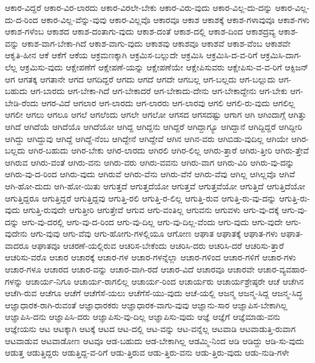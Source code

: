 {ಆಕಾರ-ವಿದ್ದರೆ
ಆಕಾರ-ವಿರ-ಲಾರದು
ಆಕಾರ-ವಿರಲೇ-ಬೇಕು
ಆಕಾರ-ವಿರು-ವುದು
ಆಕಾರ-ವಿಲ್ಲ-ದು-ದನ್ನು
ಆಕಾರ-ವಿಲ್ಲ-ದು-ದ-ರಿಂದ
ಆಕಾರ-ವಿಲ್ಲ-ವೆನ್ನು-ವುವು
ಆಕಾರ-ವಿಲ್ಲವೊ
ಆಕಾರವೂ
ಆಕಾಶ
ಆಕಾಶಕ್ಕೆ
ಆಕಾಶ-ಗಳಾವುವೂ
ಆಕಾಶ-ಗಳು
ಆಕಾಶ-ಗಳೆಂಬ
ಆಕಾಶದ
ಆಕಾಶ-ದಂತಾಗು-ವುದು
ಆಕಾಶ-ದಂತೆ
ಆಕಾಶ-ದಲ್ಲಿ
ಆಕಾಶ-ದಿಂದ
ಆಕಾಶದ್ರವ್ಯ
ಆಕಾಶ-ವನ್ನು
ಆಕಾಶ-ವಾಗ-ಬೇಕಾ-ಗಿದೆ
ಆಕಾಶ-ವಾಗು-ವುದು
ಆಕಾಶವು
ಆಕಾಶವೂ
ಆಕಾಶವೆ
ಆಕಾಶ-ವೆಂಬ
ಆಕಾಶವೇ
ಆಕೃತಿ-ಹೀನ
ಆಕೆ
ಆಕೆಗೆ
ಆಕೆಯ
ಆಕ್ರಮಣಕ್ಕಾಗಿ
ಆಕ್ರಮಿಸ-ಬಲ್ಲುದೇ
ಆಕ್ರಮಿಸಿ
ಆಕ್ರಮಿಸಿ-ದ-ವ-ರಿಗೆ
ಆಕ್ರಮಿಸಿ-ದಾಗ-ಲೆಲ್ಲ
ಆಕ್ರಮಿಸು-ವುದು
ಆಕ್ಷೇಪಣೆಗೆ
ಆಕ್ಷೇಪಣೆ-ಯನ್ನು
ಆಕ್ಷೇಪಣೆಯೇ
ಆಕ್ಷೇಪಿಸುವರು
ಆಕ್ಷೇಪಿಸು-ವ-ವ-ರಿಗೆ
ಆಕ್ಸಿಜನ್
ಆಗ
ಆಗತಕ್ಕ
ಆಗತಾನೇ
ಆಗದ
ಆಗದಿದ್ದರೆ
ಆಗದು
ಆಗದೆ
ಆಗದೇ
ಆಗಬಲ್ಲ
ಆಗ-ಬಲ್ಲದು
ಆಗ-ಬಲ್ಲುದು
ಆಗ-ಬಹುದು
ಆಗ-ಬಾರದು
ಆಗ-ಬೇಕಾ-ಗಿದೆ
ಆಗ-ಬೇಕಾದರೆ
ಆಗ-ಬೇಕಾದು-ದೇನು
ಆಗ-ಬೇಕಾದ್ದೇನು
ಆಗ-ಬೇಕು
ಆಗ-ಬೇಡಿ-ರೆಂದು
ಆಗರ-ವಿದೆ
ಆಗಲಾರ
ಆಗ-ಲಾರದು
ಆಗ-ಲಾರರು
ಆಗ-ಲಾರವು
ಆಗಲಿ
ಆಗಲಿ-ರು-ವುದು
ಆಗಲಿಲ್ಲ
ಆಗಲೀ
ಆಗಲು
ಆಗಲೂ
ಆಗಲೆ
ಆಗಲೆಂದು
ಆಗಲೇ
ಆಗಲೋ
ಆಗಸದ
ಆಗಸದಷ್ಟು
ಆಗಾಗ
ಆಗಿ
ಆಗಿಂದಾಗ್ಗೆ
ಆಗಿತ್ತು
ಆಗಿದೆ
ಆಗಿದೆಯೆ
ಆಗಿದೆಯೊ
ಆಗಿದೆಯೋ
ಆಗಿದ್ದ
ಆಗಿದ್ದನು
ಆಗಿದ್ದರೆ
ಆಗಿದ್ದಾಗ್ಯೂ
ಆಗಿದ್ದಾನೆ
ಆಗಿದ್ದಿದ್ದರೆ
ಆಗಿದ್ದೀರಿ
ಆಗಿದ್ದು
ಆಗಿದ್ದುವು
ಆಗಿದ್ದೆ
ಆಗಿದ್ದೆ-ನೆಂಬ
ಆಗಿದ್ದೇನೆ
ಆಗಿದ್ದೇವೆ
ಆಗಿನ
ಆಗಿನ-ವರು
ಆಗಿಬಿಡು-ವುದಿಲ್ಲ
ಆಗಿಯೇ
ಆಗಿರ-ಬಲ್ಲದು
ಆಗಿರ-ಬಹುದು
ಆಗಿರ-ಬೇಕು
ಆಗಿರ-ಲಾರದು
ಆಗಿರಲಿ
ಆಗಿರ-ಲಿಲ್ಲ
ಆಗಿರು-ತ್ತಾರೆ
ಆಗಿರು-ತ್ತೀರಿ
ಆಗಿರು-ತ್ತೇವೆ
ಆಗಿರುವ
ಆಗಿರು-ವಂತೆ
ಆಗಿರು-ವನು
ಆಗಿರು-ವರು
ಆಗಿರು-ವವನು
ಆಗಿರು-ವಾಗ
ಆಗಿರು-ವಿರಿ
ಆಗಿರು-ವು-ದನ್ನು
ಆಗಿರು-ವು-ದ-ರಿಂದ
ಆಗಿರು-ವುದು
ಆಗಿರುವೆ
ಆಗಿರು-ವೆನು
ಆಗಿರು-ವೆನೆ
ಆಗಿರು-ವೆವು
ಆಗಿಲ್ಲ
ಆಗಿಲ್ಲವೊ
ಆಗಿವೆ
ಆಗಿ-ಹೋ-ದುದು
ಆಗಿ-ಹೋ-ಯಿತು
ಆಗುತ್ತದೆ
ಆಗುತ್ತದೆಯೋ
ಆಗುತ್ತವೆ
ಆಗುತ್ತವೆಯೋ
ಆಗುತ್ತಿದೆ
ಆಗುತ್ತಿದೆಯೋ
ಆಗುತ್ತಿದ್ದರೂ
ಆಗುತ್ತಿದ್ದರೆ
ಆಗುತ್ತಿದ್ದವು
ಆಗುತ್ತಿ-ರಲಿ
ಆಗುತ್ತಿ-ರ-ಲಿಲ್ಲ
ಆಗುತ್ತಿ-ರುವ
ಆಗುತ್ತಿ-ರು-ವು-ದನ್ನು
ಆಗುತ್ತಿ-ರು-ವುದು
ಆಗುತ್ತಿ-ರುವುದೇ
ಆಗುತ್ತೀರಿ
ಆಗುತ್ತೇವೆ
ಆಗುವ
ಆಗು-ವಂತಿಲ್ಲ
ಆಗುವನು
ಆಗುವಳು
ಆಗು-ವು-ದಕ್ಕೆ
ಆಗು-ವು-ದನ್ನು
ಆಗು-ವು-ದರಲ್ಲಿ
ಆಗು-ವು-ದ-ರಿಂದ
ಆಗು-ವು-ದಿಲ್ಲ
ಆಗು-ವು-ದಿಲ್ಲ-ವೆಂದು
ಆಗು-ವುದು
ಆಗು-ವುದೇ
ಆಗು-ವುದೇನು
ಆಗು-ವುವು
ಆಗು-ವೆವು
ಆಗು-ಹೋಗು-ಗಳಲ್ಲಿಯೂ
ಆಗೋಣ
ಆಘಾತ
ಆಘಾತಕ್ಕೆ
ಆಘಾತ-ಗಳು
ಆಘಾತ-ವಾದರೂ
ಆಘಾತವೂ
ಆಚರಣೆ-ಯಲ್ಲಿರುವ
ಆಚರಿಸ-ಬೇಕೆಂದು
ಆಚರಿಸಿ-ದರು
ಆಚರಿಸಿ-ದರೆ
ಆಚರಿಸು-ತ್ತಾರೆ
ಆಚರಿಸು-ವರೊ
ಆಚಾರ
ಆಚಾರಕ್ಕೆ
ಆಚಾರ-ಗಳ
ಆಚಾರ-ಗಳನ್ನೆಲ್ಲಾ
ಆಚಾರ-ಗಳಿಂದ
ಆಚಾರ-ಗಳಿಗೆ
ಆಚಾರ-ಗಳು
ಆಚಾರ-ಗಳೂ
ಆಚಾರದ
ಆಚಾರ-ವನ್ನು
ಆಚಾರ-ವಾಗಿ-ರದೆ
ಆಚಾರ-ವಿದೆ
ಆಚಾರವೂ
ಆಚಾರವೇ
ಆಚಾರ-ವ್ಯವಹಾರ-ಗಳನ್ನು
ಆಚಾರ್ಯ-ನಿಗೂ
ಆಚಾರ್ಯ-ರಾಗಲಿಲ್ಲ
ಆಚಾರ್ಯ-ರಿಂದ
ಆಚಾರ್ಯರು
ಆಚಾರ್ಯಶ್ರೇಷ್ಠರೇ
ಆಚೆ
ಆಚೆಗಿನ
ಆಚೆಗಿ-ರುವ
ಆಚೆಗೂ
ಆಚೆಗೆ
ಆಚೆಗೆಸೆ-ಯಲು
ಆಚೆಗೆಸೆ-ಯು-ವುದು
ಆಚೆ-ಯಲ್ಲಿ
ಆಜನ್ಮ
ಆಜನ್ಮ-ಸಿದ್ದ
ಆಜನ್ಮ-ಸಿದ್ಧ
ಆಜ್ಞಾಧಾರಕ-ರಾಗಿ-ರುವಂತೆ
ಆಜ್ಞಾಧಾರಕರು
ಆಜ್ಞಾಧಾರಕ-ವಾಗು-ವುವು
ಆಜ್ಞಾನು-ಸಾರ
ಆಜ್ಞಾಪಿಸ-ಬೇಕಾಗಿಲ್ಲ
ಆಜ್ಞಾಪಿಸಿ-ದನು
ಆಜ್ಞಾಪಿಸಿ-ದರು
ಆಜ್ಞಾಪಿಸು-ವು-ದಿಲ್ಲ
ಆಜ್ಞಾಪಿಸು-ವುದು
ಆಜ್ಞೆ
ಆಜ್ಞೆಗೆ
ಆಜ್ಞೆಮಾಡು-ವನು
ಆಜ್ಞೇಯನು
ಆಟ
ಆಟಕ್ಕಾಗಿ
ಆಟಕ್ಕೆ
ಆಟದ
ಆಟ-ದಲ್ಲಿ
ಆಟ-ವನ್ನು
ಆಟ-ವನ್ನೆಲ್ಲ
ಆಟವಾಡಿ
ಆಟವಾಡುತ್ತಿ-ರುವಾಗ
ಆಟವಾಡುವ
ಆಟವಾಡೋಣ
ಆಟವೂ
ಆಡ-ಬಹುದು
ಆಡ-ಬೇಕಾಗಿಲ್ಲ
ಆಡಮ್ಮಿ-ನಿಂದ
ಆಡಿ
ಆಡಿದ್ದು
ಆಡಿ-ಸು-ವುದು
ಆಡುತ್ತ
ಆಡುತ್ತಿದ್ದರು
ಆಡುತ್ತಿದ್ದ-ವ-ರಿಗೆ
ಆಡು-ತ್ತಿರುವ
ಆಡು-ತ್ತಿರು-ವನು
ಆಡು-ತ್ತಿರು-ವುದು
ಆಡು-ನುಡಿ-ಗಳೇ
}

